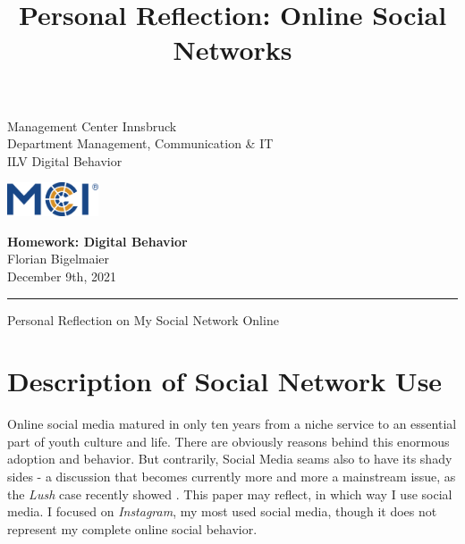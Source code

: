 \documentclass[11pt,letterpaper]{article}
\newcommand{\fontsmall}{\fontsize{7pt}{10pt}\selectfont}
\newcommand{\fontnormal}{\fontsize{11pt}{16pt}\selectfont}
\newcommand{\headline}{\fontsize{17pt}{26pt}\selectfont}
\begin{document}
   \title{Personal Reflection: Online Social Networks}



\noindent\begin{minipage}{0.5\textwidth}
\fontsmall
Management Center Innsbruck \\
Department Management, Communication \& IT  \\
ILV Digital Behavior


\end{minipage}%
\hfill%
\begin{minipage}{0.3\textwidth}\raggedleft
\includegraphics[height=1.0cm]{mci-logo.png}

\end{minipage}



\begin{center}
\textbf{Homework: Digital Behavior}\\   %
Florian Bigelmaier\\                         %
December 9th, 2021\\                         %
\end{center}
\rule{\linewidth}{0.1mm}




\headline \begin{center}
Personal Reflection on My Social Network Online
\end{center}
\fontnormal

\section*{Description of Social Network Use}
\begin{center}
\textit{}\autocite[][]{Perrin.2015}
\end{center}

Online social media matured in only ten years from a niche service to an essential part of youth culture and life. There are obviously reasons behind this enormous adoption and behavior. But contrarily, Social Media seams also to have its shady sides - a discussion that becomes currently more and more a mainstream issue, as the \textit{Lush} case recently showed \autocite[][]{Wood.2021}. This paper may reflect, in which way I use social media. I focused on \textit{Instagram}, my most used social media, though it does not represent my complete online social behavior.
\end{document}
